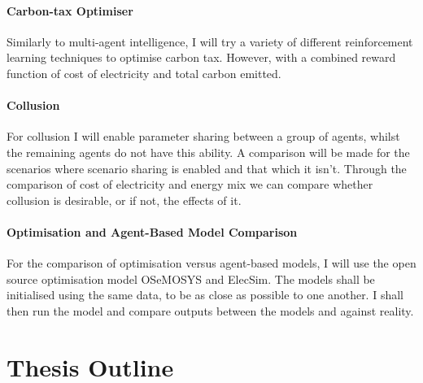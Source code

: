\documentclass[12pt]{article}
\begin{document}
\paragraph{Carbon-tax Optimiser}

Similarly to multi-agent intelligence, I will try a variety of different reinforcement learning techniques to optimise carbon tax. However, with a combined reward function of cost of electricity and total carbon emitted.

\paragraph{Collusion}

For collusion I will enable parameter sharing between a group of agents, whilst the remaining agents do not have this ability. A comparison will be made for the scenarios where scenario sharing is enabled and that which it isn't. Through the comparison of cost of electricity and energy mix we can compare whether collusion is desirable, or if not, the effects of it.

\paragraph{Optimisation and Agent-Based Model Comparison}

For the comparison of optimisation versus agent-based models, I will use the open source optimisation model OSeMOSYS and ElecSim. The models shall be initialised using the same data, to be as close as possible to one another. I shall then run the model and compare outputs between the models and against reality.













\clearpage

\section{Thesis Outline}
\end{document}

